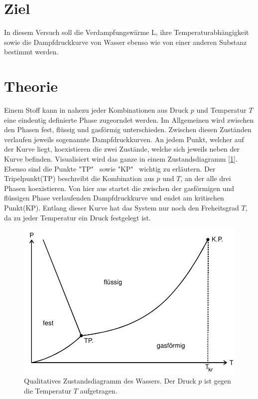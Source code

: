\section{Ziel}
In diesem Versuch soll die Verdampfungswärme L, ihre Temperaturabhängigkeit sowie die Dampfdruckkurve
von Wasser ebenso wie von einer anderen Substanz bestimmt werden.
\section{Theorie}
\label{sec:Theorie}
\cite{sample}
Einem Stoff kann in nahezu jeder Kombinationen aus Druck $p$ und Temperatur $T$ eine eindeutig definierte Phase zugeorndet werden.
Im Allgemeinen wird zwischen den Phasen fest, flüssig und gasförmig unterschieden. Zwischen diesen Zuständen verlaufen jeweils
sogenannte Dampfdruckkurven. An jedem Punkt, welcher auf der Kurve liegt, koexistieren die zwei Zustände, welche sich jeweils neben der Kurve befinden.
Visualisiert  wird das ganze in einem Zustandsdiagramm [\ref{fig:Zustandsdiagramm}]. Ebenso sind die Punkte "TP" \, sowie "KP" \, wichtig zu erläutern. Der Tripelpunkt(TP) beschreibt die Kombination
aus $p$ und $T$, an der alle drei Phasen koexistieren. Von hier aus startet die zwischen der gasförmigen und flüssigen Phase verlaufenden Dampfdruckkurve und
endet am kritischen Punkt(KP). Entlang dieser Kurve hat das System nur noch den Freheitsgrad  $T$, da zu jeder Temperatur ein Druck festgelegt ist.
\begin{figure}[h]
    \centering
    \includegraphics[scale=0.8]{"screen.jpg"}
    \caption{Qualitatives Zustandsdiagramm des Wassers. Der Druck $p$ ist gegen die Temperatur $T$ aufgetragen.}
    \label{fig:Zustandsdiagramm}
\end{figure}
